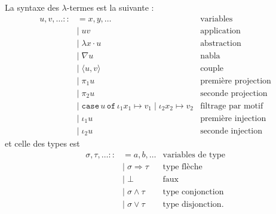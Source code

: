 \documentclass[a4paper]{article}
\theoremstyle{remark}
\theoremstyle{remark}
\theoremstyle{remark}
\theoremstyle{definition}
\theoremstyle{definition}
\theoremstyle{definition}
\begin{document}
La syntaxe des $\lambda$-termes est la suivante :
\begin{align*}
u, v, \ldots ::&= x, y, \ldots & \text{variables}\\
&| \; uv & \text{application} \\
&| \; \lambda x \cdot u & \text{abstraction} \\
&| \; \nabla u & \text{nabla} \\
&| \; \langle u, v \rangle & \text{couple} \\
&| \; \pi_1 u & \text{première projection} \\
&| \; \pi_2 u & \text{seconde projection} \\
&| \; \mathtt{case} \, u \, \mathtt{of} \, \iota_1 x_1 \mapsto v_1 \; | \; \iota_2 x_2 \mapsto v_2 & \text{filtrage par motif} \\
&| \; \iota_1 u & \text{première injection} \\
&| \; \iota_2 u & \text{seconde injection}
\end{align*} et celle des types est \begin{align*}
\sigma, \tau, \ldots ::&= a, b, \ldots & \text{variables de type} \\
&| \; \sigma \Rightarrow \tau & \text{type flèche} \\
&| \; \bot & \text{faux} \\
&| \; \sigma \wedge \tau & \text{type conjonction} \\
&| \; \sigma \vee \tau & \text{type disjonction}.
\end{align*}
\end{document}
